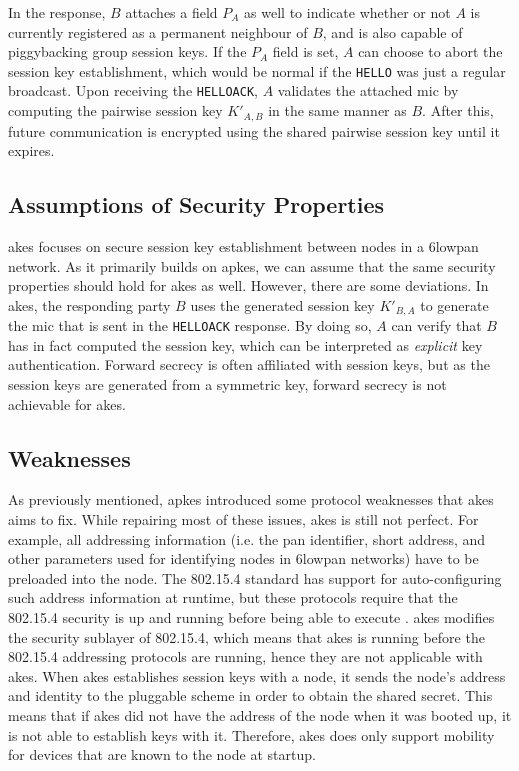 In the response, $B$ attaches a field $P_A$ as well to indicate whether or not $A$ is currently registered as a permanent neighbour of $B$, and is also capable of piggybacking group session keys. If the $P_A$ field is set, $A$ can choose to abort the session key establishment, which would be normal if the \texttt{HELLO} was just a regular broadcast. Upon receiving the \texttt{HELLOACK}, $A$ validates the attached \gls{mic} by computing the pairwise session key $K'_{A, B}$ in the same manner as $B$. After this, future communication  is encrypted using the shared pairwise session key until it expires.


\subsection{Assumptions of Security Properties}
\label{subsec:akes-props}

\gls{akes} focuses on secure session key establishment between nodes in a \gls{6lowpan} network. As it primarily builds on \gls{apkes}, we can assume that the same security properties should hold for \gls{akes} as well. However, there are some deviations. In \gls{akes}, the responding party $B$ uses the generated session key $K'_{B,A}$ to generate the \gls{mic} that is sent in the \texttt{HELLOACK} response. By doing so, $A$ can verify that $B$ has in fact computed the session key, which can be interpreted as \emph{explicit} key authentication. Forward secrecy is often affiliated with session keys, but as the session keys are generated from a symmetric key, forward secrecy is not achievable for \gls{akes}. 



\subsection{Weaknesses}

As previously mentioned, \gls{apkes} introduced some protocol weaknesses that \gls{akes} aims to fix. While repairing most of these issues, \gls{akes} is still not perfect. For example, all addressing information (i.e. the \gls{pan} identifier, short address, and other parameters used for identifying nodes in \gls{6lowpan} networks) have to be preloaded into the node. The 802.15.4 standard has support for auto-configuring such address information at runtime, but these protocols require that the 802.15.4 security is up and running before being able to execute \cite{krentz2015handling}. \gls{akes} modifies the security sublayer of 802.15.4, which means that \gls{akes} is running before the 802.15.4 addressing protocols are running, hence they are not applicable with \gls{akes}. When \gls{akes} establishes session keys with a node, it sends the node's address and identity to the pluggable scheme in order to obtain the shared secret. This means that if \gls{akes} did not have the address of the node when it was booted up, it is not able to establish keys with it. Therefore, \gls{akes} does only support mobility for devices that are known to the node at startup.

